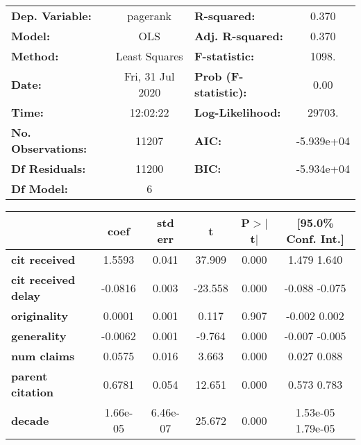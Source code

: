 \begin{center}
\begin{tabular}{lclc}
\toprule
\textbf{Dep. Variable:}     &     pagerank     & \textbf{  R-squared:         } &      0.370    \\
\textbf{Model:}             &       OLS        & \textbf{  Adj. R-squared:    } &      0.370    \\
\textbf{Method:}            &  Least Squares   & \textbf{  F-statistic:       } &      1098.    \\
\textbf{Date:}              & Fri, 31 Jul 2020 & \textbf{  Prob (F-statistic):} &      0.00     \\
\textbf{Time:}              &     12:02:22     & \textbf{  Log-Likelihood:    } &     29703.    \\
\textbf{No. Observations:}  &       11207      & \textbf{  AIC:               } &  -5.939e+04   \\
\textbf{Df Residuals:}      &       11200      & \textbf{  BIC:               } &  -5.934e+04   \\
\textbf{Df Model:}          &           6      & \textbf{                     } &               \\
\bottomrule
\end{tabular}
\begin{tabular}{lccccc}
                            & \textbf{coef} & \textbf{std err} & \textbf{t} & \textbf{P$>$$|$t$|$} & \textbf{[95.0\% Conf. Int.]}  \\
\midrule
\textbf{cit received}       &       1.5593  &        0.041     &    37.909  &         0.000        &         1.479     1.640       \\
\textbf{cit received delay} &      -0.0816  &        0.003     &   -23.558  &         0.000        &        -0.088    -0.075       \\
\textbf{originality}        &       0.0001  &        0.001     &     0.117  &         0.907        &        -0.002     0.002       \\
\textbf{generality}         &      -0.0062  &        0.001     &    -9.764  &         0.000        &        -0.007    -0.005       \\
\textbf{num claims}         &       0.0575  &        0.016     &     3.663  &         0.000        &         0.027     0.088       \\
\textbf{parent citation}    &       0.6781  &        0.054     &    12.651  &         0.000        &         0.573     0.783       \\
\textbf{decade}             &     1.66e-05  &     6.46e-07     &    25.672  &         0.000        &      1.53e-05  1.79e-05       \\

\end{tabular}
\end{center}
